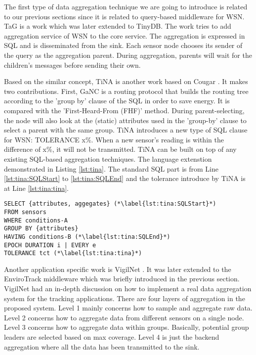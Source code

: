 The first type of data aggregation technique we are going to introduce is related to our previous sections since it is related to query-based middleware for WSN. TaG \cite{tag} is a work which was later extended to TinyDB. The work tries to add aggregation service of WSN to the core service. The aggregation is expressed in SQL and is disseminated from the sink. Each sensor node chooses its sender of the query as the aggregation parent. During aggregation, parents will wait for the children's messages before sending their own.

Based on the similar concept, TiNA \cite{tina} is another work based on Cougar \cite{cougar}. It makes two contributions. First, GaNC is a routing protocol that builds the routing tree according to the 'group by' clause of the SQL in order to save energy. It is compared with the 'First-Heard-From (FHF)' method. During parent-selecting, the node will also look at the (static) attributes used in the 'group-by' clause to select a parent with the same group. TiNA introduces a new type of SQL clause for WSN: TOLERANCE x\%. When a new sensor's reading is within the difference of x\%, it will not be transmitted. TiNA can be built on top of any existing SQL-based aggregation techniques. The language extenstion demonstrated in Listing \ref{lst:tina}. The standard SQL part is from Line \ref{lst:tina:SQLStart} to \ref{lst:tina:SQLEnd} and the tolerance introduce by TiNA is at Line \ref{lst:tina:tina}.

\begin{lstlisting}[caption=An example of TiNA, label=lst:tina]
SELECT {attributes, aggegates} (*\label{lst:tina:SQLStart}*)
FROM sensors
WHERE conditions-A
GROUP BY {attributes}
HAVING conditions-B (*\label{lst:tina:SQLEnd}*)
EPOCH DURATION i | EVERY e
TOLERANCE tct (*\label{lst:tina:tina}*)
\end{lstlisting}

Another application specific work is VigilNet \cite{vigilnet}. It was later extended to the EnviroTrack middleware \cite{envirotrack} which was briefly introduced in the previous section. VigilNet had an in-depth discussion on how to implement a real data aggregation system for the tracking applications. There are four layers of aggregation in the proposed system. Level 1 mainly concerns how to sample and aggregate raw data. Level 2 concerns how to aggregate data from different sensors on a single node. Level 3 concerns how to aggregate data within groups. Basically, potential group leaders are selected based on max coverage. Level 4 is just the backend aggregation where all the data has been transmitted to the sink.

